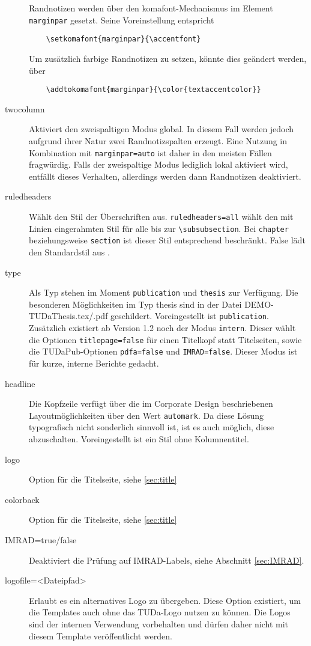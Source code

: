 \documentclass[
	ngerman,
	accentcolor=9c,%
	]{tudapub}
\let\code\texttt
\begin{document}
\begin{description}
	Randnotizen werden über den komafont-Mechanismus \cite[vgl.][]{scrguide} im Element \code{marginpar} gesetzt. Seine Voreinstellung entspricht
	\begin{verbatim}
	\setkomafont{marginpar}{\accentfont}
	\end{verbatim}
	Um zusätzlich farbige Randnotizen zu setzen, könnte dies geändert werden, über
	\begin{verbatim}
	\addtokomafont{marginpar}{\color{textaccentcolor}}
	\end{verbatim}
	\item[twocolumn] Aktiviert den zweispaltigen Modus global. In diesem Fall werden jedoch aufgrund ihrer Natur zwei Randnotizspalten erzeugt. Eine Nutzung in Kombination mit \code{marginpar=auto} ist daher in den meisten Fällen fragwürdig. Falls der zweispaltige Modus lediglich lokal aktiviert wird, entfällt dieses Verhalten, allerdings werden dann Randnotizen deaktiviert.
	\item[ruledheaders] Wählt den Stil der Überschriften aus. \code{ruledheaders=all} wählt den mit Linien eingerahmten Stil für alle bis zur \verb+\subsubsection+. Bei \code{chapter} beziehungsweise \code{section} ist dieser Stil entsprechend
	beschränkt. False lädt den Standardstil aus \KOMAScript.
	\item[type] Als Typ stehen im Moment \code{publication} und \code{thesis} zur Verfügung. Die besonderen Möglichkeiten im Typ thesis sind in der Datei DEMO-TUDaThesis.tex/.pdf geschildert. Voreingestellt ist \code{publication}.
	Zusätzlich existiert ab Version 1.2 noch der Modus \code{intern}. Dieser wählt die Optionen \code{titlepage=false} für einen Titelkopf statt Titelseiten, sowie die TUDaPub-Optionen \code{pdfa=false} und \code{IMRAD=false}. Dieser Modus ist für kurze, interne Berichte gedacht.
	\item[headline] Die Kopfzeile verfügt über die im Corporate Design beschriebenen Layoutmöglichkeiten über den Wert \code{automark}. Da diese Lösung typografisch nicht sonderlich sinnvoll ist, ist es auch möglich, diese abzuschalten. Voreingestellt ist ein Stil ohne Kolumnentitel.
	\item[logo] Option für die Titelseite, siehe \ref{sec:title}
	\item[colorback] Option für die Titelseite, siehe \ref{sec:title}
	\item[IMRAD=true/false] Deaktiviert die Prüfung auf IMRAD-Labels, siehe Abschnitt \ref{sec:IMRAD}.
	\item[logofile=<Dateipfad>] Erlaubt es ein alternatives Logo zu übergeben. Diese Option existiert, um die Templates auch ohne das TUDa-Logo nutzen zu können. Die Logos sind der internen Verwendung vorbehalten und dürfen daher nicht mit diesem Template veröffentlicht werden.
\end{description}
\end{document}

